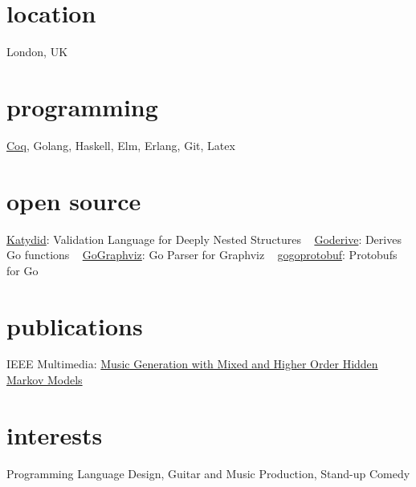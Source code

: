 \documentclass[print]{friggeri-cv-a4} %
\begin{document}

\begin{aside} %
\section{location}
London, UK
\section{programming}
\href{https://coq.inria.fr/}{Coq}, Golang, Haskell, Elm, Erlang, Git, Latex
\section{open source}
\href{https://github.com/katydid/katydid}{Katydid}: Validation Language for Deeply Nested Structures
~
\href{https://github.com/awalterschulze/goderive}{Goderive}: Derives Go functions
~
\href{https://github.com/awalterschulze/gographviz}{GoGraphviz}: Go Parser for Graphviz
~
\href{https://github.com/gogo/protobuf}{gogoprotobuf}: Protobufs for Go
\section{publications}
IEEE Multimedia: \href{http://doi.ieeecomputersociety.org/10.1109/MMUL.2010.44}{Music Generation with Mixed and Higher Order Hidden Markov Models}
\section{interests}
Programming Language Design, Guitar and Music Production, Stand-up Comedy
\end{aside}
\end{document}

